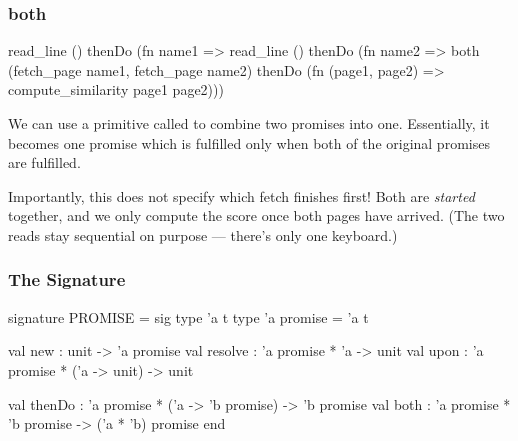\documentclass[aspectratio=169]{beamer}
\begin{document}
\begin{frame}[fragile]
  \frametitle{both}

  \begin{codeblock}
    read_line () thenDo (fn name1 =>
    read_line () thenDo (fn name2 =>
      both (fetch_page name1, fetch_page name2)
        thenDo (fn (page1, page2) =>
          compute_similarity page1 page2)))
\end{codeblock}

  \pause
  \vspace{\fill}

  We can use a primitive called
   to
  combine two promises into one. Essentially, it becomes one promise which
  is fulfilled only when both of the original promises are fulfilled.

  \pause
  \vspace{\fill}

  Importantly, this does not specify which fetch finishes first! Both
  are \textit{started} together, and we only compute the score once both
  pages have arrived. (The two reads stay sequential on purpose ---
  there's only one keyboard.)
\end{frame}

\begin{frame}[fragile]
  \frametitle{The Signature}

  \begin{codeblock}
signature PROMISE =
sig
  type 'a t
  type 'a promise = 'a t

  val new     : unit -> 'a promise
  val resolve : 'a promise * 'a -> unit
  val upon    : 'a promise * ('a -> unit) -> unit

  val thenDo  : 'a promise * ('a -> 'b promise) -> 'b promise
  val both    : 'a promise * 'b promise -> ('a * 'b) promise
end
\end{codeblock}
\end{frame}
\end{document}
